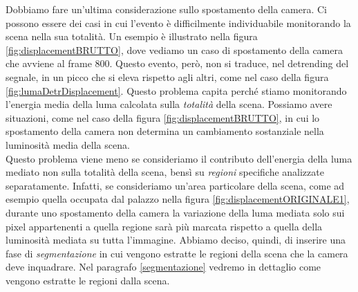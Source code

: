 Dobbiamo fare un'ultima considerazione sullo spostamento della camera.
Ci possono essere dei casi in cui l'evento \`e difficilmente individuabile monitorando la scena nella sua totalit\`a.
Un esempio \`e illustrato nella figura \ref{fig:displacementBRUTTO}, dove vediamo un caso di spostamento della camera che avviene al frame $800$.
Questo evento, per\`o, non si traduce, nel detrending del segnale, in un picco che si eleva rispetto agli altri, come nel caso della figura \ref{fig:lumaDetrDisplacement}.
Questo problema capita perch\'e stiamo monitorando l'energia media della luma calcolata sulla \textit{totalit\`a} della scena.
Possiamo avere situazioni, come nel caso della figura \ref{fig:displacementBRUTTO}, in cui lo spostamento della camera non determina un cambiamento sostanziale nella luminosit\`a media della scena.\\
Questo problema viene meno se consideriamo il contributo dell'energia della luma mediato non sulla totalit\`a della scena, bens\`i su \textit{regioni} specifiche analizzate separatamente.
Infatti, se consideriamo un'area particolare della scena, come ad esempio quella occupata dal palazzo nella figura \ref{fig:displacementORIGINALE1}, durante uno spostamento della camera la variazione della luma mediata solo sui pixel appartenenti a quella regione sar\`a pi\`u marcata rispetto a quella della luminosit\`a mediata su tutta l'immagine.
Abbiamo deciso, quindi, di inserire una fase di \textit{segmentazione} in cui vengono estratte le regioni della scena che la camera deve inquadrare. 
Nel paragrafo \ref{segmentazione} vedremo in dettaglio come vengono estratte le regioni dalla scena.
